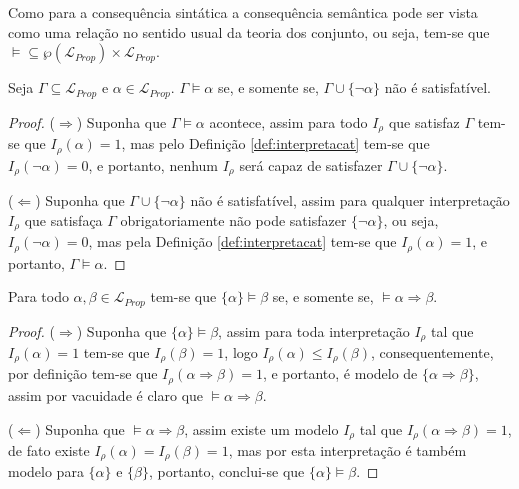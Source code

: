 \begin{rema}
    Como para a consequência sintática a consequência semântica pode ser vista como uma relação no sentido usual da teoria dos conjunto, ou seja, tem-se que $\vDash \subseteq \wp(\mathcal{L}_{Prop}) \times \mathcal{L}_{Prop}$.
\end{rema}

\begin{theorem}\label{teo:TeoremaRefutacao}
    Seja $\Gamma \subseteq \mathcal{L}_{Prop}$ e $\alpha \in \mathcal{L}_{Prop}$. $\Gamma \vDash \alpha$ se, e somente se, $\Gamma \cup \{\neg \alpha\}$ não é satisfatível. 
\end{theorem}

\begin{proof}
    ($\Rightarrow$) Suponha que  $\Gamma \vDash \alpha$ acontece, assim para todo $I_\rho$ que satisfaz $\Gamma$ tem-se que $I_\rho(\alpha) = 1$, mas pelo Definição \ref{def:interpretacat} tem-se que $I_\rho(\neg \alpha) = 0$, e portanto, nenhum $I_\rho$ será capaz de satisfazer $\Gamma \cup \{\neg \alpha\}$. 
    
    ($\Leftarrow$) Suponha que $\Gamma \cup \{\neg \alpha\}$ não é satisfatível, assim para qualquer interpretação $I_\rho$ que satisfaça $\Gamma$ obrigatoriamente não pode satisfazer $\{\neg \alpha\}$, ou seja, $I_\rho(\neg \alpha) = 0$, mas pela Definição \ref{def:interpretacat} tem-se que $I_\rho( \alpha) = 1$, e portanto, $\Gamma \vDash \alpha$.
\end{proof}

\begin{theorem}\label{teo:TeoremaDeducaoSemantico}
    Para todo $\alpha, \beta \in \mathcal{L}_{Prop}$ tem-se que $\{\alpha\} \vDash \beta$ se, e somente se,  $\vDash \alpha \Rightarrow \beta$.
\end{theorem}

\begin{proof}
    ($\Rightarrow$) Suponha que $\{\alpha\} \vDash \beta$, assim para toda interpretação $I_\rho$ tal que $I_\rho(\alpha) = 1$ tem-se que $I_\rho(\beta) = 1$, logo $I_\rho(\alpha) \leq I_\rho(\beta)$, consequentemente, por definição tem-se que $I_\rho(\alpha \Rightarrow \beta) = 1$, e portanto, é modelo de $\{\alpha \Rightarrow \beta\}$, assim por vacuidade é claro que $\vDash \alpha \Rightarrow \beta$.
    
    ($\Leftarrow$) Suponha que $\vDash \alpha \Rightarrow \beta$, assim existe um modelo $I_\rho$ tal que $I_\rho(\alpha \Rightarrow \beta) = 1$, de fato existe $I_\rho(\alpha) = I_\rho(\beta) = 1$, mas por esta interpretação é também modelo para $\{\alpha\}$ e $\{\beta\}$, portanto, conclui-se que  $\{\alpha\} \vDash \beta$.
\end{proof}

